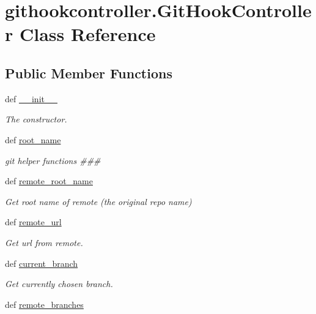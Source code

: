 \section{githookcontroller.\-Git\-Hook\-Controller Class Reference}
\label{classgithookcontroller_1_1GitHookController}
\subsection*{Public Member Functions}
\begin{DoxyCompactItemize}
\item 
def \hyperlink{classgithookcontroller_1_1GitHookController_a3f9a0075420262ba2568316c76061966}{\-\_\-\-\_\-init\-\_\-\-\_\-}
\begin{DoxyCompactList}\small\item\em The constructor. \end{DoxyCompactList}\item 
def \hyperlink{classgithookcontroller_1_1GitHookController_a584fe8bed0edc20058e18467a6e6906c}{root\-\_\-name}
\begin{DoxyCompactList}\small\item\em git helper functions \#\#\# \end{DoxyCompactList}\item 
def \hyperlink{classgithookcontroller_1_1GitHookController_a3324d38801396b1269a97890798103d5}{remote\-\_\-root\-\_\-name}
\begin{DoxyCompactList}\small\item\em Get root name of remote (the original repo name) \end{DoxyCompactList}\item 
def \hyperlink{classgithookcontroller_1_1GitHookController_a4cf33d4adccdb044fa9514a49849e797}{remote\-\_\-url}
\begin{DoxyCompactList}\small\item\em Get url from remote. \end{DoxyCompactList}\item 
def \hyperlink{classgithookcontroller_1_1GitHookController_a7a4041c01fb80bffb487936866f62f98}{current\-\_\-branch}
\begin{DoxyCompactList}\small\item\em Get currently chosen branch. \end{DoxyCompactList}\item 
def \hyperlink{classgithookcontroller_1_1GitHookController_a39661900fa09468fa6f1cb97ba859e80}{remote\-\_\-branches}

\end{DoxyCompactItemize}
